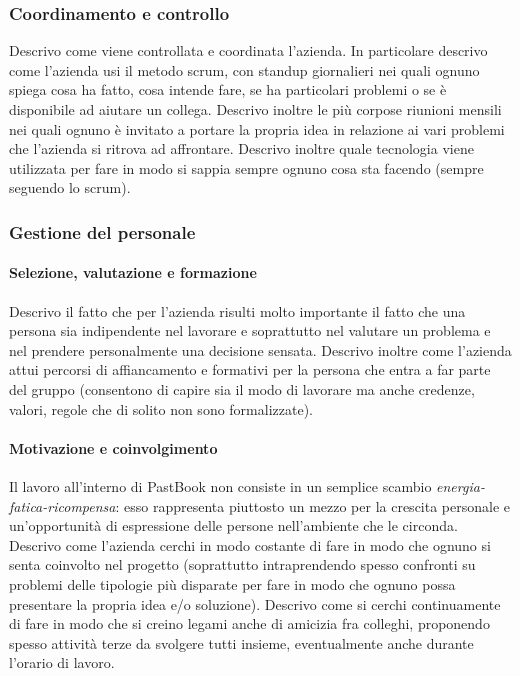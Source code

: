 			\subsubsection{Coordinamento e controllo}
				Descrivo come viene controllata e coordinata l'azienda. In particolare descrivo come l'azienda usi il metodo scrum,
				con standup giornalieri nei quali ognuno spiega cosa ha fatto, cosa intende fare, se ha particolari problemi o se è
				disponibile ad aiutare un collega. Descrivo inoltre le più corpose riunioni mensili nei quali ognuno è invitato a
				portare la propria idea in relazione ai vari problemi che l'azienda si ritrova ad affrontare. Descrivo inoltre quale
				tecnologia viene utilizzata per fare in modo si sappia sempre ognuno cosa sta facendo (sempre seguendo lo scrum).
			\subsubsection{Gestione del personale}
				\paragraph{Selezione, valutazione e formazione}
					Descrivo il fatto che per l'azienda risulti molto importante il fatto che una persona sia indipendente nel
					lavorare e soprattutto nel valutare un problema e nel prendere personalmente una decisione sensata.
					Descrivo inoltre come l'azienda attui percorsi di affiancamento e formativi per la persona che entra a far
					parte del gruppo (consentono di capire sia il modo di lavorare ma anche credenze, valori, regole che di
					solito non sono formalizzate).
				\paragraph{Motivazione e coinvolgimento}
					Il lavoro all'interno di PastBook non consiste in un semplice scambio \emph{energia-fatica-ricompensa}: esso
				rappresenta piuttosto un mezzo per la crescita personale e un'opportunità di espressione delle persone nell'ambiente
				che le circonda.\\
					Descrivo come l'azienda cerchi in modo costante di fare in modo che ognuno si senta coinvolto nel progetto
					(soprattutto intraprendendo spesso confronti su problemi delle tipologie più disparate per fare in modo che
					ognuno possa presentare la propria idea e/o soluzione).
					Descrivo come si cerchi continuamente di fare in modo che si creino legami anche di amicizia fra colleghi,
					proponendo spesso attività terze da svolgere tutti insieme, eventualmente anche durante l'orario di lavoro.
